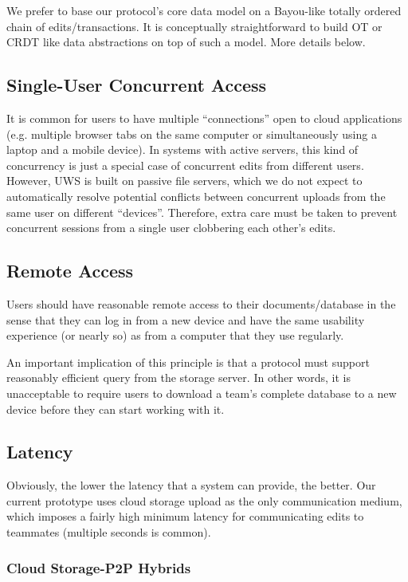 \documentclass{article}
\begin{document}
We prefer to base our protocol's core data model on a Bayou-like totally ordered chain of edits/transactions.
It is conceptually straightforward to build OT or CRDT like data abstractions on top of such a model.
More details below.

\subsection{Single-User Concurrent Access}

It is common for users to have multiple ``connections'' open to cloud applications (e.g. multiple browser tabs on the same computer or simultaneously using a laptop and a mobile device).
In systems with active servers, this kind of concurrency is just a special case of concurrent edits from different users.
However, UWS is built on passive file servers, which we do not expect to automatically resolve potential conflicts between concurrent uploads from the same user on different ``devices''.
Therefore, extra care must be taken to prevent concurrent sessions from a single user clobbering each other's edits.

\subsection{Remote Access}

Users should have reasonable remote access to their documents/database in the sense that they can log in from a new device and have the same usability experience (or nearly so) as from a computer that they use regularly.

An important implication of this principle is that a protocol must support reasonably efficient query from the storage server.
In other words, it is unacceptable to require users to download a team's complete database to a new device before they can start working with it.

\subsection{Latency}

Obviously, the lower the latency that a system can provide, the better.
Our current prototype uses cloud storage upload as the only communication medium, which imposes a fairly high minimum latency for communicating edits to teammates (multiple seconds is common).

\subsubsection{Cloud Storage-P2P Hybrids}
\end{document}
